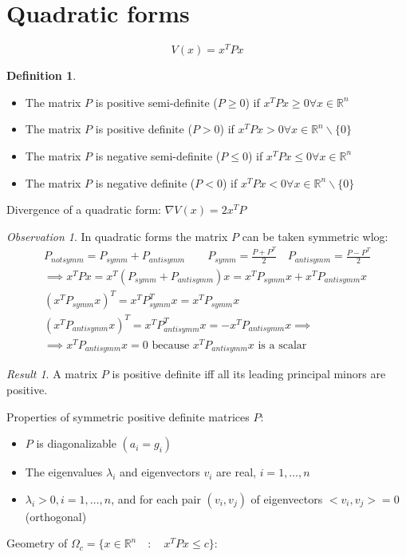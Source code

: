\documentclass{book}
\newcommand{\R}{\mathbb{R}}
\theoremstyle{definition}
\newtheorem{definition}{Definition}[section]
\theoremstyle{remark}
\theoremstyle{remark}
\newtheorem*{result}{Result}
\newtheorem*{observation}{Observation}
\begin{document}
\section{Quadratic forms}
\[V(x)=x^TPx\]
\begin{definition}
    \begin{itemize}
        \item The matrix $P$ is positive semi-definite ($P\geq 0$) if $x^TPx\geq 0 \forall x \in \R^n$
        \item The matrix $P$ is positive definite ($P> 0$) if $x^TPx> 0 \forall x \in \R^n\backslash\{0\}$
        \item The matrix $P$ is negative semi-definite ($P\leq 0$) if $x^TPx\leq 0 \forall x \in \R^n$
        \item The matrix $P$ is negative definite ($P< 0$) if $x^TPx< 0 \forall x \in \R^n\backslash\{0\}$
    \end{itemize}
\end{definition}
Divergence of a quadratic form: $\nabla V(x)=2x^TP$
\begin{observation}
    In quadratic forms the matrix $P$ can be taken symmetric wlog:
    \begin{gather*}
        P_{not symm}=P_{symm}+P_{antisymm} \qquad P_{symm}=\frac{P+P^T}{2} \quad P_{antisymm}=\frac{P-P^T}{2}\\
        \implies x^TPx=x^T(P_{symm}+P_{antisymm})x=x^TP_{symm}x+x^TP_{antisymm}x\\
        (x^TP_{symm}x)^T=x^TP_{symm}^Tx=x^TP_{symm}x\\
        (x^TP_{antisymm}x)^T=x^TP_{antisymm}^Tx=-x^TP_{antisymm}x \implies \\ 
        \implies x^TP_{antisymm}x=0 \text{ because } x^TP_{antisymm}x \text{ is a scalar}
    \end{gather*}
\end{observation}

\begin{result}
    A matrix $P$ is positive definite iff all its leading principal minors are positive.
\end{result}
Properties of symmetric positive definite matrices $P$:\begin{itemize}
    \item $P$ is diagonalizable $(a_i=g_i)$
    \item The eigenvalues $\lambda_i$ and eigenvectors $v_i$ are real, $i=1,\dots,n$
    \item $\lambda_i>0, i=1,\dots,n$, and for each pair $(v_i,v_j)$ of eigenvectors $<v_i,v_j>=0$ (orthogonal)
\end{itemize}
Geometry of $\Omega_c=\{x\in\R^n \quad : \quad x^TPx\leq c\}$:
\end{document}
